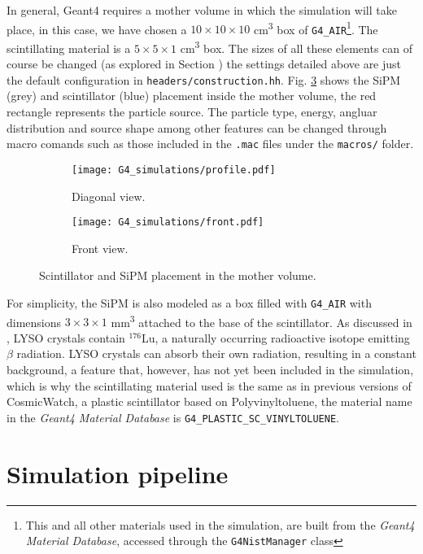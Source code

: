 In general, Geant4 requires a mother volume in which the simulation will take place, in this case, we have chosen a $10\times10\times10$ \unit{\cm\cubed} box of \texttt{G4\_AIR}\footnote{This and all other materials used in the simulation, are built from the \textit{Geant4 Material Database}, accessed through the \texttt{G4NistManager} class}. The scintillating material is a $5\times5\times1$ \unit{\cm\cubed} box. The sizes of all these elements can of course be changed (as explored in Section ) the settings detailed above are just the default configuration in \texttt{headers/construction.hh}. Fig. \ref{fig:geometry} shows the SiPM (grey) and scintillator (blue) placement inside the mother volume, the red rectangle represents the particle source. The particle type, energy, angluar distribution and source shape among other features can be changed through macro comands such as those included in the \texttt{.mac} files under the \texttt{macros/} folder.

\begin{figure}[H]
  \centering
  \begin{subfigure}[t]{0.48\textwidth}
    \texttt{[image: G4\_simulations/profile.pdf]}
    \caption{\label{sfig:geometry_profile}Diagonal view.}
  \end{subfigure}
  \hfill
  \begin{subfigure}[t]{0.48\textwidth}
    \texttt{[image: G4\_simulations/front.pdf]}
    \caption{\label{sfig:geometry_front}Front view.}
  \end{subfigure}
  \caption{\label{fig:geometry}Scintillator and SiPM placement in the mother volume.}
\end{figure}

For simplicity, the SiPM is also modeled as a box filled with \texttt{G4\_AIR} with dimensions $3\times3\times1$ \unit{\mm\cubed} attached to the base of the scintillator. As discussed in , LYSO crystals contain $^{176}$Lu, a naturally occurring radioactive isotope emitting $\beta$ radiation. LYSO crystals can absorb their own radiation, resulting in a constant background, a feature that, however, has not yet been included in the simulation, which is why the scintillating material used is the same as in previous versions of CosmicWatch, a plastic scintillator based on Polyvinyltoluene, the material name in the \textit{Geant4 Material Database} is \texttt{G4\_PLASTIC\_SC\_VINYLTOLUENE}.

\section{Simulation pipeline}

